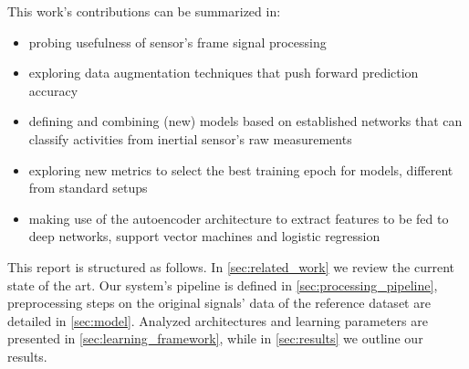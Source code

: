 This work's contributions can be summarized in:
\begin{itemize}
    \item probing usefulness of sensor's frame signal processing
    \item exploring data augmentation techniques that push forward prediction accuracy
    \item defining and combining (new) models based on established networks that can classify activities from inertial sensor's raw measurements
    \item exploring new metrics to select the best training epoch for models, different from standard setups
    \item making use of the autoencoder architecture to extract features to be fed to deep networks, support vector machines and logistic regression
\end{itemize}

This report is structured as follows.
In \autoref{sec:related_work} we review the current state of the art.
Our system's pipeline is defined in \autoref{sec:processing_pipeline}, preprocessing steps on the original signals' data of the reference dataset are detailed in \autoref{sec:model}.
Analyzed architectures and learning parameters are presented in \autoref{sec:learning_framework}, while in \autoref{sec:results} we outline our results.